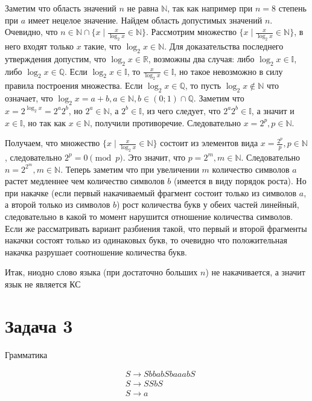 \documentclass[a4paper, 14pt]{extarticle}
\begin{document}
Заметим что область значений $n$ не равна $\mathbb{N}$, так как например при $n = 8$
степень при $a$ имеет нецелое значение. Найдем область допустимых значений $n$. Очевидно,
что $n \in \mathbb{N} \cap \{x \mid \frac{x}{\log_2x} \in \mathbb{N}\}$. Рассмотрим множество
$\{x \mid \frac{x}{\log_2x} \in \mathbb{N}\}$, в него входят только $x$ такие, что
$\log_{2}x \in \mathbb{N}$. Для доказательства последнего утверждения допустим, что
$\log_2x \in \mathbb{R}$, возможны два случая: либо $\log_2x \in \mathbb{I}$, либо
$\log_2x \in \mathbb{Q}$. Если $\log_2x \in \mathbb{I}$, то $\frac{x}{\log_2x} \in \mathbb{I}$,
но такое невозможно в силу правила построения множества. Если $\log_2x \in \mathbb{Q}$, то пусть
$\log_2x \notin \mathbb{N}$ что означает, что
$\log_2x = a + b, a \in \mathbb{N}, b \in (0;1) \cap \mathbb{Q}$. Заметим что
$x = 2^{\log_2x} = 2^a2^b$, но $2^a \in \mathbb{N}$, а $2^b \in \mathbb{I}$, из чего
следует, что $2^a2^b \in \mathbb{I}$, а значит и $x \in \mathbb{I}$, но так как
$x \in \mathbb{N}$, получили противоречие. Следовательно $x = 2^p, p \in \mathbb{N}$.

Получаем, что множество $\{x \mid \frac{x}{\log_2x} \in \mathbb{N}\}$
состоит из элементов вида $x = \frac{2^p}{p}, p \in \mathbb{N}$, следовательно
$2^p = 0 \pmod{p}$. Это значит, что $p = 2^m, m \in \mathbb{N}$. Следовательно
$n = 2^{2^m}, m \in \mathbb{N}$. Теперь заметим что при увеличении $m$ количество символов
$a$ растет медленнее чем количество символов $b$ (имеется в виду порядок роста). Но при
накачке (если первый накачиваемый фрагмент состоит только из символов $a$, а второй только
из символов $b$) рост количества букв у обеих частей линейный, следовательно в какой то момент
нарушится отношение количества символов. Если же рассматривать вариант разбиения такой, что
первый и второй фрагменты накачки состоят только из одинаковых букв, то очевидно что
положительная накачка разрушает соотношение количества букв.

Итак, ниодно слово языка (при достаточно больших $n$) не накачивается, а значит язык не является
КС

\newpage
\section{Задача 3}

Грамматика

\begin{align}
  &S \to SbbabSbaaabS \\
  &S \to SSbS \\
  &S \to a
\end{align}
\end{document}
